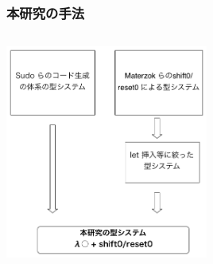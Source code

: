 \documentclass[dvipdfmx,cjk,xcolor=dvipsnames,envcountsect,notheorems,12pt]{beamer}
\theoremstyle{definition}
\begin{document}
\begin{frame}[fragile]
  \frametitle{本研究の手法}
  \begin{columns}

    \begin{column}{1.\textwidth}%
      \center
      \includegraphics[clip,height=7cm]{./img/type_system_me.png}
    \end{column}



  \end{columns}
\end{frame}

\end{document}
